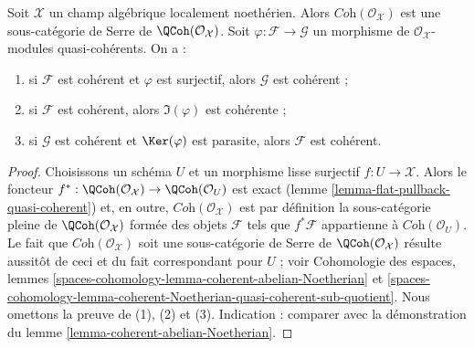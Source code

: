 \begin{lemma}
\label{lemma-coherent-Noetherian-quasi-coherent-sub-quotient}
Soit $\mathcal{X}$ un champ algébrique localement noethérien.
Alors $\textit{Coh}(\mathcal{O}_\mathcal{X})$ est une sous-catégorie de Serre de
$\QCoh(\mathcal{O}_\mathcal{X})$. Soit $\varphi : \mathcal{F} \to \mathcal{G}$
un morphisme de $\mathcal{O}_\mathcal{X}$-modules quasi-cohérents. On a :
\begin{enumerate}
\item si $\mathcal{F}$ est cohérent et $\varphi$ est surjectif,
alors $\mathcal{G}$ est cohérent ;
\item si $\mathcal{F}$ est cohérent, alors $\Im(\varphi)$ est cohérente ;
\item si $\mathcal{G}$ est cohérent et $\Ker(\varphi)$ est parasite, alors
$\mathcal{F}$ est cohérent.
\end{enumerate}
\end{lemma}

\begin{proof}
Choisissons un schéma $U$ et un morphisme lisse surjectif $f : U \to \mathcal{X}$.
Alors le foncteur
$f^* : \QCoh(\mathcal{O}_\mathcal{X}) \to \QCoh(\mathcal{O}_U)$
est exact (lemme \ref{lemma-flat-pullback-quasi-coherent})
et, en outre, $\textit{Coh}(\mathcal{O}_\mathcal{X})$ est par définition
la sous-catégorie pleine de $\QCoh(\mathcal{O}_\mathcal{X})$ formée
des objets $\mathcal{F}$ tels que $f^*\mathcal{F}$ appartienne à
$\textit{Coh}(\mathcal{O}_U)$. Le fait que
$\textit{Coh}(\mathcal{O}_\mathcal{X})$ soit une sous-catégorie de Serre de
$\QCoh(\mathcal{O}_\mathcal{X})$ résulte aussitôt de ceci
et du fait correspondant pour $U$ ; voir
Cohomologie des espaces, lemmes
\ref{spaces-cohomology-lemma-coherent-abelian-Noetherian} et
\ref{spaces-cohomology-lemma-coherent-Noetherian-quasi-coherent-sub-quotient}.
Nous omettons la preuve de (1), (2) et (3). Indication : comparer
avec la démonstration du lemme \ref{lemma-coherent-abelian-Noetherian}.
\end{proof}

